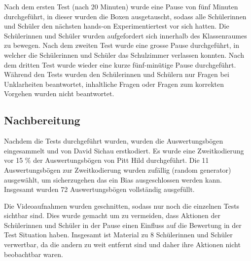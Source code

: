 Nach dem ersten Test (nach 20 Minuten) wurde eine Pause von fünf Minuten durchgeführt, in dieser wurden die Boxen ausgetauscht, sodass alle Schülerinnen und Schüler den nächsten hands-on Experimentiertest vor sich hatten. Die Schülerinnen und Schüler wurden aufgefordert sich innerhalb des Klassenraumes zu bewegen. Nach dem zweiten Test wurde eine grosse Pause durchgeführt, in welcher die Schülerinnen und Schüler das Schulzimmer verlassen konnten. Nach dem dritten Test wurde wieder eine kurze fünf-minütige Pause durchgeführt. Während den Tests wurden den Schülerinnen und Schülern nur Fragen bei Unklarheiten beantwortet, inhaltliche Fragen oder Fragen zum korrekten Vorgehen wurden nicht beantwortet. 

\subsection{Nachbereitung}

Nachdem die Tests durchgeführt wurden, wurden die Auswertungsbögen eingesammelt und von David Sichau erstkodiert. Es wurde eine Zweitkodierung vor 15 \% der Auswertungsbögen von Pitt Hild durchgeführt. Die 11 Auswertungsbögen zur Zweitkodierung wurden zufällig (random generator) ausgewählt, um sicherzugehen das ein Bias ausgeschlossen werden kann. Insgesamt wurden 72 Auswertungsbögen vollständig ausgefüllt. 

Die Videoaufnahmen wurden geschnitten, sodass nur noch die einzelnen Tests sichtbar sind. Dies wurde gemacht um zu vermeiden, dass Aktionen der Schülerinnen und Schüler in der Pause einen Einfluss auf die Bewertung in der Test Situation haben. Insgesamt ist Material zu 8 Schülerinnen und Schüler verwertbar, da die andern zu weit entfernt sind und daher ihre Aktionen nicht beobachtbar waren.

